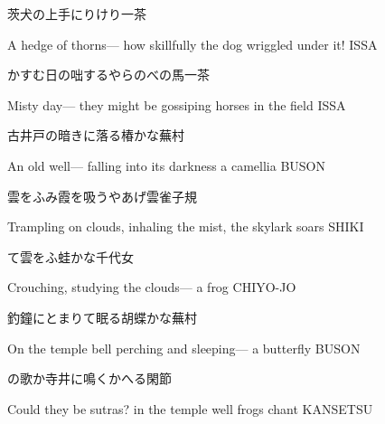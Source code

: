 \begin{haiku}
    {\FH 茨犬の上手にりけり}\hfill{\FH 一茶}

    \vin{} A hedge of thorns---
    \vin{} \vin{} how skillfully the dog
    \vin{} \vin{} \vin{} wriggled under it! \hspace{\fill} ISSA
\end{haiku}

\begin{haiku}
    {\FH かすむ日の咄するやらのべの馬}\hfill{\FH 一茶}

    \vin{} Misty day---
    \vin{} \vin{} they might be gossiping
    \vin{} \vin{} \vin{} horses in the field \hspace{\fill} ISSA
\end{haiku}

\begin{haiku}
    {\FH 古井戸の暗きに落る椿かな}\hfill{\FH 蕪村}

    \vin{} An old well---
    \vin{} \vin{} falling into its darkness
    \vin{} \vin{} \vin{} a camellia \hspace{\fill} BUSON
\end{haiku}

\begin{haiku}
    {\FH 雲をふみ霞を吸うやあげ雲雀}\hfill{\FH 子規}

    \vin{} Trampling on clouds,
    \vin{} \vin{} inhaling the mist,
    \vin{} \vin{} \vin{} the skylark soars \hspace{\fill} SHIKI
\end{haiku}

\begin{haiku}
    {\FH {}て雲をふ蛙かな}\hfill{\FH 千代女}

    \vin{} Crouching,
    \vin{} \vin{} studying the clouds---
    \vin{} \vin{} \vin{} a frog \hspace{\fill} CHIYO-JO
\end{haiku}

\begin{haiku}
    {\FH 釣鐘にとまりて眠る胡蝶かな}\hfill{\FH 蕪村}

    \vin{} On the temple bell
    \vin{} \vin{} perching and sleeping---
    \vin{} \vin{} \vin{} a butterfly \hspace{\fill} BUSON
\end{haiku}

\begin{haiku}
    {\FH {}の歌か寺井に鳴くかへる}\hfill{\FH 閑節}

    \vin{} Could they be sutras?
    \vin{} \vin{} in the temple well
    \vin{} \vin{} \vin{} frogs chant \hspace{\fill} KANSETSU
\end{haiku}

